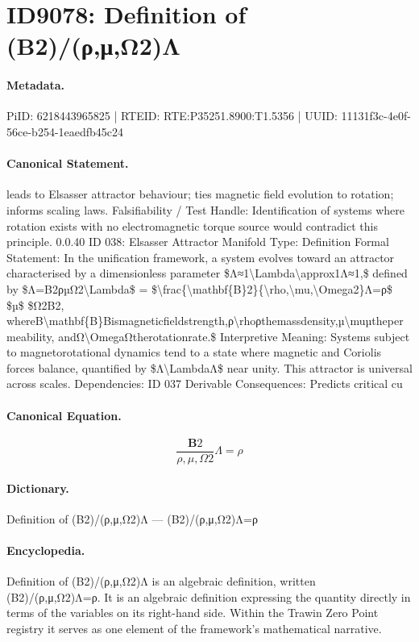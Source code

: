 \section*{ID9078: Definition of (B2)/(ρ,μ,Ω2)Λ}
\paragraph{Metadata.}
PiID: 6218443965825 | RTEID: RTE:P35251.8900:T1.5356 | UUID: 11131f3c-4e0f-56ce-b254-1eaedfb45c24

\paragraph{Canonical Statement.}
leads to Elsasser attractor behaviour; ties magnetic field evolution to rotation; informs scaling laws. Falsifiability / Test Handle: Identification of systems where rotation exists with no electromagnetic torque source would contradict this principle. 0.0.40 ID 038: Elsasser Attractor Manifold Type: Definition Formal Statement: In the unification framework, a system evolves toward an attractor characterised by a dimensionless parameter \$Λ≈1\textbackslash{}Lambda\textbackslash{}approx1Λ≈1,\$ defined by \$Λ=B2ρµΩ2\textbackslash{}Lambda\$ = \$\textbackslash{}frac\{\textbackslash{}mathbf\{B\}2\}\{\textbackslash{}rho,\textbackslash{}mu,\textbackslash{}Omega2\}Λ=ρ\$ \$µ\$ \$Ω2B2, whereB\textbackslash{}mathbf\{B\}Bismagneticfieldstrength,ρ\textbackslash{}rhoρthemassdensity,µ\textbackslash{}muµthepermeability, andΩ\textbackslash{}OmegaΩtherotationrate.\$ Interpretive Meaning: Systems subject to magnetorotational dynamics tend to a state where magnetic and Coriolis forces balance, quantified by \$Λ\textbackslash{}LambdaΛ\$ near unity. This attractor is universal across scales. Dependencies: ID 037 Derivable Consequences: Predicts critical cu

\paragraph{Canonical Equation.}
\[
\frac{\mathbf{B}2}{\rho,\mu,\Omega2}Λ=ρ
\]

\paragraph{Dictionary.}
Definition of (B2)/(ρ,μ,Ω2)Λ — (B2)/(ρ,μ,Ω2)Λ=ρ

\paragraph{Encyclopedia.}
Definition of (B2)/(ρ,μ,Ω2)Λ is an algebraic definition, written (B2)/(ρ,μ,Ω2)Λ=ρ. It is an algebraic definition expressing the quantity directly in terms of the variables on its right-hand side. Within the Trawin Zero Point registry it serves as one element of the framework's mathematical narrative.
